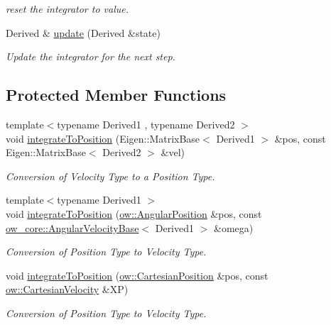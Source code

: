 \begin{DoxyCompactItemize}
\begin{DoxyCompactList}\small\item\em reset the integrator to value. \end{DoxyCompactList}\item 
Derived \& \hyperlink{classow__core_1_1StateIntegrator_a49c205e4ad5cedfdf21db4b963602673}{update} (Derived \&state)
\begin{DoxyCompactList}\small\item\em Update the integrator for the next step. \end{DoxyCompactList}\end{DoxyCompactItemize}
\subsection*{Protected Member Functions}
\begin{DoxyCompactItemize}
\item 
{\footnotesize template$<$typename Derived1 , typename Derived2 $>$ }\\void \hyperlink{classow__core_1_1StateIntegrator_a73b711f13e5b472530e7d5fd8087f464}{integrate\+To\+Position} (Eigen\+::\+Matrix\+Base$<$ Derived1 $>$ \&pos, const Eigen\+::\+Matrix\+Base$<$ Derived2 $>$ \&vel)
\begin{DoxyCompactList}\small\item\em Conversion of Velocity Type to a Position Type. \end{DoxyCompactList}\item 
{\footnotesize template$<$typename Derived1 $>$ }\\void \hyperlink{classow__core_1_1StateIntegrator_a187c4a1242d3651f454a2194ebd0c202}{integrate\+To\+Position} (\hyperlink{classow__core_1_1AngularPosition}{ow\+::\+Angular\+Position} \&pos, const \hyperlink{classow__core_1_1AngularVelocityBase}{ow\+\_\+core\+::\+Angular\+Velocity\+Base}$<$ Derived1 $>$ \&omega)
\begin{DoxyCompactList}\small\item\em Conversion of Position Type to Velocity Type. \end{DoxyCompactList}\item 
void \hyperlink{classow__core_1_1StateIntegrator_ad6ed45c53513617f734c5ec78ff53a0d}{integrate\+To\+Position} (\hyperlink{classow__core_1_1CartesianPosition}{ow\+::\+Cartesian\+Position} \&pos, const \hyperlink{classow__core_1_1CartesianVelocity}{ow\+::\+Cartesian\+Velocity} \&XP)
\begin{DoxyCompactList}\small\item\em Conversion of Position Type to Velocity Type. \end{DoxyCompactList}\item 

\end{DoxyCompactItemize}

